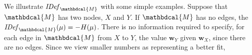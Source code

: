 \documentclass{article}
\theoremstyle{plain}
\theoremstyle{definition}
\theoremstyle{remark}
\newcommand\mat[1]{\mathbf{#1}}
\newcommand{\commentout}[1]{\ignorespaces}
\newcommand{\dg}[1]{\mathbdcal{#1}}
\newcommand{\IDef}[1]{\mathit{IDef}_{#1}}
\numberwithin{equation}{section}
\begin{document}
We illustrate $\IDef{\dg M}$ with some simple examples.  
%
\commentout{
	
  This approach combines the benefits of choosing
the maximum-entropy distribution consistent with
constraints \cite{Jaynes57}, while also providing the ability to back off of this (e.g., by providing a universal graph structure), and simultaneously providing a way of articulating qualitative independences.
There is no information required
}
Suppose that $\dg M$ has two nodes, $X$ and $Y$.  
If $\dg M$ has no edges, the $\IDef{\dg M}(\mu) = - H(\mu)$.
There is no information required to specify, for each edge in ${\dg
  M}$ from $X$ to
$Y$, the value ${\mat w}_Y$ given ${\mat w}_X$, since there are no
edges.
Since we view smaller numbers as representing a better fit,
\end{document}
